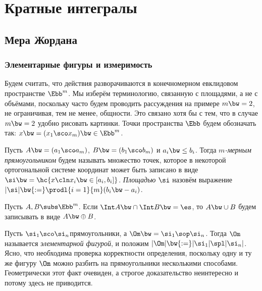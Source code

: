 \documentclass[a4paper]{article}
\begin{document}
\pagebreak
\pagestyle{headings}

\makeatletter
  \renewcommand{\headheight}{11mm}
  \renewcommand{\headsep}{2mm}
  \renewcommand{\sectionmark}[1]{}
  \renewcommand{\subsectionmark}[1]{}
  \renewcommand{\subsubsectionmark}[1]{\markright{\thesubsubsection. #1}}
  \renewcommand{\@oddhead}{\vbox{\hbox to \textwidth{\scriptsize\thepage\hfil\rightmark\strut}\hrule}}
  \renewcommand{\@oddfoot}{\hfil\thepage\hfil}
\makeatother

\section{Кратные интегралы}

\subsection{Мера Жордана}

\subsubsection{Элементарные фигуры и измеримость}

Будем считать, что действия разворачиваются в конечномерном евклидовом пространстве $\Ebb^m$. Мы
изберём терминологию, связанную с площадями, а не с объёмами, поскольку часто будем проводить
рассуждения на примере $m\bw=2$, не ограничивая, тем не менее, общности. Это связано хотя бы с тем,
что в случае $m\bw=2$ удобно рисовать картинки. Точки пространства $\Ebb$ будем обозначать так:
$x\bw=(x_1\sco x_m) \bw\in \Ebb^m$.

\begin{df}
Пусть $A\bw=(a_1\sco a_m)$, $B\bw=(b_1\sco b_m)$ и $a_i \bw\le b_i$. Тогда \emph{$m$-мерным
прямоугольником} будем называть множество точек, которое в некоторой ортогональной системе
координат может быть записано в виде $\si\bw= \hc{x \cln x_i \bw\in [a_i,b_i]}$. \emph{Площадью} $\si$
назовём выражение $|\si| \bw{:=} \prodl{i=1}{m}(b_i\bw-a_i)$.
\end{df}

\begin{df}
Пусть $A, B \subs \Ebb^m$. Если $\Int A \bw\cap \Int B \bw= \es$, то $A \bw\cup B$ будем записывать
в виде $A \bw\oplus B$.
\end{df}

\begin{df}
Пусть $\si_1\sco\si_n$\т прямоугольники, а $\Om \bw= \si_1\sop\si_n$. Тогда $\Om$ называется
\emph{элементарной фигурой}, и положим $|\Om| \bw{:=} |\si_1|\spl|\si_n|$. Ясно, что необходима
проверка корректности определения, поскольку одну и ту же фигуру $\Om$ можно разбить на
прямоугольники несколькими способами. Геометрически этот факт очевиден, а строгое доказательство
неинтересно и потому здесь не приводится.
\end{df}
\end{document}
